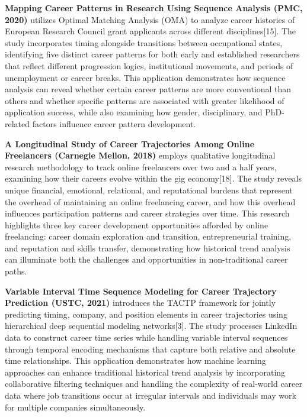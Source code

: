 \documentclass[./main.tex]{subfiles}
\begin{document}
\textbf{Mapping Career Patterns in Research Using Sequence Analysis
(PMC, 2020)} utilizes Optimal Matching Analysis (OMA) to analyze career
histories of European Research Council grant applicants across different
disciplines{[}15{]}. The study incorporates timing alongside transitions
between occupational states, identifying five distinct career patterns
for both early and established researchers that reflect different
progression logics, institutional movements, and periods of unemployment
or career breaks. This application demonstrates how sequence analysis
can reveal whether certain career patterns are more conventional than
others and whether specific patterns are associated with greater
likelihood of application success, while also examining how gender,
disciplinary, and PhD-related factors influence career pattern
development.

\textbf{A Longitudinal Study of Career Trajectories Among Online
Freelancers (Carnegie Mellon, 2018)} employs qualitative longitudinal
research methodology to track online freelancers over two and a half
years, examining how their careers evolve within the gig
economy{[}18{]}. The study reveals unique financial, emotional,
relational, and reputational burdens that represent the overhead of
maintaining an online freelancing career, and how this overhead
influences participation patterns and career strategies over time. This
research highlights three key career development opportunities afforded
by online freelancing: career domain exploration and transition,
entrepreneurial training, and reputation and skills transfer,
demonstrating how historical trend analysis can illuminate both the
challenges and opportunities in non-traditional career paths.

\textbf{Variable Interval Time Sequence Modeling for Career Trajectory
Prediction (USTC, 2021)} introduces the TACTP framework for jointly
predicting timing, company, and position elements in career trajectories
using hierarchical deep sequential modeling networks{[}3{]}. The study
processes LinkedIn data to construct career time series while handling
variable interval sequences through temporal encoding mechanisms that
capture both relative and absolute time relationships. This application
demonstrates how machine learning approaches can enhance traditional
historical trend analysis by incorporating collaborative filtering
techniques and handling the complexity of real-world career data where
job transitions occur at irregular intervals and individuals may work
for multiple companies simultaneously.
\end{document}
